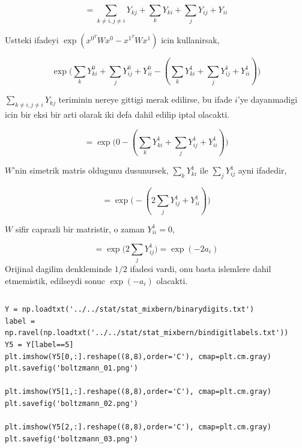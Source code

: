 \documentclass[12pt,fleqn]{article}\usepackage{../common}
\begin{document}
$$ 
= \sum_{k \ne i,j \ne i} Y_{kj} + \sum_{k}  Y_{ki} + \sum_{j} Y_{ij} + Y_{ii}
$$

Ustteki ifadeyi $ \exp( x^{0^T}Wx^0 -   x^{1^T}Wx^1 )$ icin kullanirsak,

$$ 
\exp 
\big( 
\sum_{k}  Y_{ki}^0 + \sum_{j} Y_{ij}^0 + Y_{ii}^0 - 
( \sum_{k}  Y_{ki}^1 + \sum_{j} Y_{ij}^1 + Y_{ii}^1  )
\big)
 $$

$\sum_{k \ne i,j \ne i} Y_{kj}$ teriminin nereye gittigi merak edilirse,
bu ifade $i$'ye dayanmadigi icin bir eksi bir arti olarak iki defa dahil
edilip iptal olacakti. 

$$ 
= \exp \big( 
0 - ( \sum_{k}  Y_{ki}^1 + \sum_{j} Y_{ij}^1 + Y_{ii}^1  ) 
\big)
 $$

$W$'nin simetrik matris oldugunu dusunursek, $\sum_{k}  Y_{ki}^1$ ile $\sum_{j}Y_{ij}^1$ ayni ifadedir, 

$$ 
= \exp \big( 
- ( 2 \sum_{j} Y_{ij}^1 + Y_{ii}^1  ) 
\big)
 $$

$W$ sifir caprazli bir matristir, o zaman $Y_{ii}^1=0$, 

$$ 
= \exp \big( 2 \sum_{j} Y_{ij}^1 \big) = \exp (- 2 a_i )
 $$
Orijinal dagilim denkleminde $1/2$ ifadesi vardi, onu basta islemlere dahil
etmemistik, edilseydi sonuc  $\exp (- a_i)$ olacakti. 


\inputminted[fontsize=\footnotesize]{python}{boltz.py}



\begin{verbatim}
Y = np.loadtxt('../../stat/stat_mixbern/binarydigits.txt')
label = np.ravel(np.loadtxt('../../stat/stat_mixbern/bindigitlabels.txt'))
Y5 = Y[label==5]
plt.imshow(Y5[0,:].reshape((8,8),order='C'), cmap=plt.cm.gray)
plt.savefig('boltzmann_01.png')

plt.imshow(Y5[1,:].reshape((8,8),order='C'), cmap=plt.cm.gray)
plt.savefig('boltzmann_02.png')

plt.imshow(Y5[2,:].reshape((8,8),order='C'), cmap=plt.cm.gray)
plt.savefig('boltzmann_03.png')
\end{verbatim}
\end{document}
